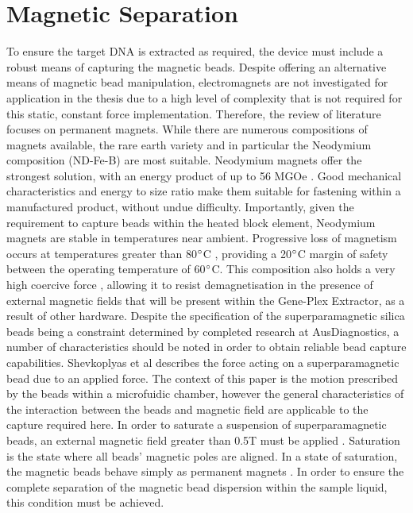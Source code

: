 \section{Magnetic Separation}
To ensure the target DNA is extracted as required, the device must include a robust means of capturing the magnetic beads. Despite offering an alternative means of magnetic bead manipulation, electromagnets are not investigated for application in the thesis due to a high level of complexity that is not required for this static, constant force implementation. Therefore, the review of literature focuses on permanent magnets. While there are numerous compositions of magnets available, the rare earth variety and in particular the Neodymium composition (ND-Fe-B) are most suitable. Neodymium magnets offer the strongest solution, with an energy product of up to 56 MGOe \cite{2006189852255}. Good mechanical characteristics and energy to size ratio make them suitable for fastening within a manufactured product, without undue difficulty. Importantly, given the requirement to capture beads within the heated block element, Neodymium magnets are stable in temperatures near ambient. Progressive loss of magnetism occurs at temperatures greater than 80$\degree$C \cite{2006189852255}, providing a 20$\degree$C margin of safety between the operating temperature of 60$\degree$C. This composition also holds a very high coercive force \cite{2006189852255}, allowing it to resist demagnetisation in the presence of external magnetic fields that will be present within the Gene-Plex Extractor, as a result of other hardware. Despite the specification of the superparamagnetic silica beads being a constraint determined by completed research at AusDiagnostics, a number of characteristics should be noted in order to obtain reliable bead capture capabilities. Shevkoplyas et al describes the force acting on a superparamagnetic bead due to an applied force. The context of this paper is the motion prescribed by the beads within a microfuidic chamber, however the general characteristics of the interaction between the beads and magnetic field are applicable to the capture required here. In order to saturate a suspension of superparamagnetic beads, an external magnetic field greater than 0.5T must be applied \cite{9774403}. Saturation is the state where all beads' magnetic poles are aligned. In a state of saturation, the magnetic beads behave simply as permanent magnets \cite{9774403}\cite{8667402}. In order to ensure the complete separation of the magnetic bead dispersion within the sample liquid, this condition must be achieved.\\

